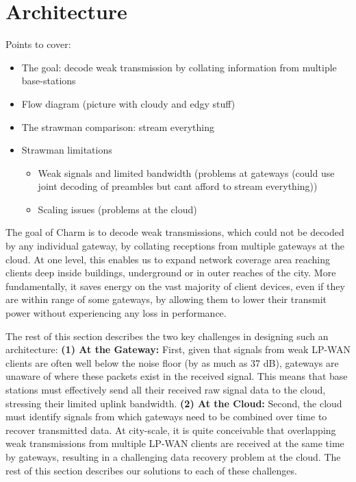 \section{Architecture}
\label{sec:arch}

{\color{blue} Points to cover:

\begin{itemize}
    \item The goal: decode weak transmission by collating information from multiple base-stations
    \item Flow diagram (picture with cloudy and edgy stuff)
    \item The strawman comparison: stream everything
    \item Strawman limitations
        \begin{itemize}
            \item Weak signals and limited bandwidth (problems at gateways (could use joint decoding of preambles but cant afford to stream everything))
            \item Scaling issues (problems at the cloud)
        \end{itemize}
\end{itemize}
}


The goal of Charm is to decode weak transmissions, which could not be
decoded by any individual gateway, by collating receptions from multiple
gateways at the cloud. At one level, this  enables us to expand network coverage area reaching clients deep inside buildings, underground or in outer reaches of the city. More fundamentally, it saves energy on the vast majority of client devices, even if they are within range of some gateways, by allowing them to lower their transmit power without experiencing any loss in performance. 

The rest of this section describes the two key challenges in designing such an architecture: {\bf (1) At the Gateway: } First, given that signals from weak LP-WAN clients are often well below the noise floor (by as much as 37 dB), gateways are unaware of where these packets exist in the received signal. This means that base stations must effectively send all their received raw signal data to the cloud, stressing their limited uplink bandwidth. {\bf (2) At the Cloud: } Second, the cloud must identify signals from which gateways need to be combined over time to recover transmitted data. At city-scale, it is quite conceivable that overlapping weak transmissions from multiple LP-WAN clients are received at the same time by gateways, resulting in a challenging data recovery problem at the cloud. The rest of this section describes our solutions to each of these challenges. 

